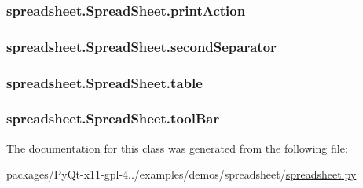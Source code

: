 \subsubsection[{print\+Action}]{\setlength{\rightskip}{0pt plus 5cm}spreadsheet.\+Spread\+Sheet.\+print\+Action}\label{classspreadsheet_1_1SpreadSheet_a7b9a9e53424a65c151e43ec7cc18ad95}
\hypertarget{classspreadsheet_1_1SpreadSheet_a1d66280450decf77a4ea246ee882e683}{}
\subsubsection[{second\+Separator}]{\setlength{\rightskip}{0pt plus 5cm}spreadsheet.\+Spread\+Sheet.\+second\+Separator}\label{classspreadsheet_1_1SpreadSheet_a1d66280450decf77a4ea246ee882e683}
\hypertarget{classspreadsheet_1_1SpreadSheet_a4cffe6375bcad3a8250d0f843fdb4476}{}
\subsubsection[{table}]{\setlength{\rightskip}{0pt plus 5cm}spreadsheet.\+Spread\+Sheet.\+table}\label{classspreadsheet_1_1SpreadSheet_a4cffe6375bcad3a8250d0f843fdb4476}
\hypertarget{classspreadsheet_1_1SpreadSheet_a06c4457678a4e54b501687b61941d6cf}{}
\subsubsection[{tool\+Bar}]{\setlength{\rightskip}{0pt plus 5cm}spreadsheet.\+Spread\+Sheet.\+tool\+Bar}\label{classspreadsheet_1_1SpreadSheet_a06c4457678a4e54b501687b61941d6cf}


The documentation for this class was generated from the following file\+:\begin{DoxyCompactItemize}
\item 
packages/\+Py\+Qt-\/x11-\/gpl-\/4../examples/demos/spreadsheet/\hyperlink{spreadsheet_8py}{spreadsheet.\+py}\end{DoxyCompactItemize}
